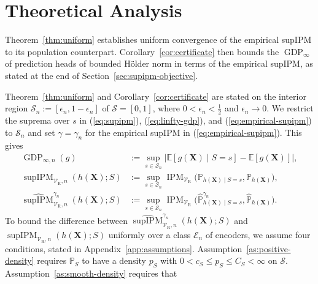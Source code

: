 \documentclass{article} %
\begin{document}
\section{Theoretical Analysis}
\label{sec:theory}

Theorem~\ref{thm:uniform} establishes uniform convergence of the empirical
supIPM to its population counterpart.
Corollary~\ref{cor:certificate} then bounds the $\operatorname{GDP}_{\infty}$ of prediction heads of bounded H\"older norm in terms of the empirical supIPM, as stated at the end of Section~\ref{sec:supipm-objective}.

Theorem~\ref{thm:uniform} and Corollary~\ref{cor:certificate} are stated on the interior region $\mathcal{S}_n:=[\epsilon_n,1-\epsilon_n]$ of $\mathcal{S}=[0,1]$, where $0<\epsilon_n<\tfrac{1}{2}$ and $\epsilon_n\to0$.  We restrict the suprema over $s$ in (\ref{eq:supipm}), (\ref{eq:linfty-gdp}), and (\ref{eq:empirical-supipm}) to $\mathcal{S}_n$ and set $\gamma=\gamma_n$ for the empirical supIPM in (\ref{eq:empirical-supipm}). This gives
\begin{equation}
\begin{aligned}
  \operatorname{GDP}_{\infty,n}(g)
  &:=\sup_{s\in\mathcal{S}_n}
     \left|\mathbb{E}[g(\mathbf{X})\mid S=s]-\mathbb{E}[g(\mathbf{X})]\right|,
  \\
  \operatorname{supIPM}_{\mathcal{V}_{\mathrm{R}},n}(h(\mathbf{X});S)
  &:=\sup_{s\in\mathcal{S}_n}
     \operatorname{IPM}_{\mathcal{V}_{\mathrm{R}}}
     \bigl(\mathbb{P}_{h(\mathbf{X})\mid S=s},
           \mathbb{P}_{h(\mathbf{X})}\bigr),
  \\
  \widehat{\operatorname{supIPM}}^{\gamma_n}_{\mathcal{V}_{\mathrm{R}},n}(h(\mathbf{X});S)
  &:=\sup_{s\in\mathcal{S}_n}
     \operatorname{IPM}_{\mathcal{V}_{\mathrm{R}}}
     \bigl(\widehat{\mathbb{P}}^{\gamma_n}_{h(\mathbf{X})\mid S=s},
           \widehat{\mathbb{P}}_{h(\mathbf{X})}\bigr).
\end{aligned}
  \label{eq:interior}
\end{equation}
To bound the difference between $\widehat{\operatorname{supIPM}}^{\gamma_n}_{\mathcal{V}_{\mathrm{R}},n}(h(\mathbf{X});S)$ and $\operatorname{supIPM}_{\mathcal{V}_{\mathrm{R}},n}(h(\mathbf{X});S)$ uniformly over a class $\mathcal{E}_n$ of encoders, we assume four conditions, stated in Appendix~\ref{app:assumptions}.  Assumption~\ref{as:positive-density} requires $\mathbb{P}_S$ to have a density $p_S$ with $0<c_S\le p_S\le C_S<\infty$ on $\mathcal{S}$.  Assumption~\ref{as:smooth-density} requires that
\end{document}
